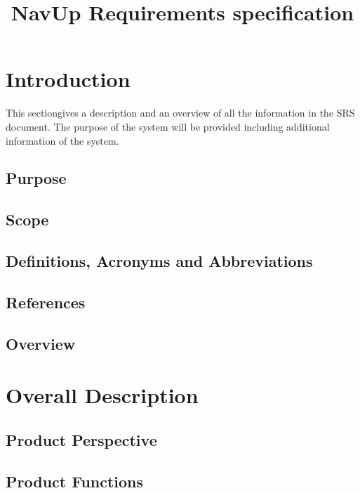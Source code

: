\documentclass{article}
\begin{document}
\title{NavUp Requirements specification}
\maketitle
\newpage
{\let\cleardoublepage\clearpage 
\maketitle
\tableofcontents
}
\section{Introduction}
This sectiongives a description and an overview of all the information in the SRS document. The purpose of the system will be provided including additional information of the system.	 
	\subsection{Purpose}
	
	
	\subsection{Scope}
	

	\subsection{Definitions, Acronyms and Abbreviations}
	
	
	\subsection{References}
	
	
	\subsection{Overview}
	
	
\section{Overall Description}
	\subsection{Product Perspective}
	

	\subsection{Product Functions}
	
	
\end{document}
